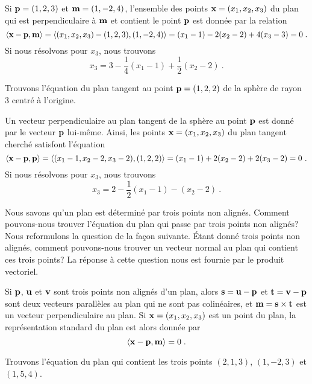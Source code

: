 {\begin{egg}
Si $\mathbf{p}=(1,2,3)$ et $\mathbf{m} = (1,-2,4)$, l'ensemble des points
$\mathbf{x}=(x_1,x_2,x_3)$ du plan qui est perpendiculaire à $\mathbf{m}$ et
contient le point $\mathbf{p}$ est donnée par la relation
\[
\left\langle{\mathbf{x}-\mathbf{p}} , {\mathbf{m}}\right\rangle =
\left\langle{(x_1,x_2,x_3) - (1,2,3)} , {(1,-2,4)}\right\rangle = (x_1-1) -2 (x_2-2) + 4(x_3-3) = 0 \; .
\]
Si nous résolvons pour $x_3$, nous trouvons
\[
x_3 = 3 - \frac{1}{4}(x_1-1)  + \frac{1}{2} (x_2-2) \ .
\]
\end{egg}

\begin{egg}
Trouvons l'équation du plan tangent au point $\mathbf{p}= (1,2,2)$ de la
sphère de rayon $3$ centré à l'origine.

Un vecteur perpendiculaire au plan tangent de la sphère au point
$\mathbf{p}$ est donné par le vecteur $\mathbf{p}$ lui-même.  Ainsi, les
points $\mathbf{x}=(x_1,x_2,x_3)$ du plan tangent cherché satisfont l'équation
\[
\ps{\VEC{x} - \VEC{p}}{\VEC{p}} = 
\ps{(x_1-1,x_2-2,x_3-2)}{(1,2,2)} = (x_1-1) + 2(x_2-2) + 2(x_3-2) = 0 \ .
\]
Si nous résolvons pour $x_3$, nous trouvons
\[
x_3 = 2 - \frac{1}{2}(x_1-1) - (x_2-2) \ .
\]
\label{TANG_PLANE}
\end{egg}

Nous savons qu'un plan est déterminé par trois points non alignés.
Comment pouvons-nous trouver l'équation du plan qui passe par trois points
non alignés?  Nous reformulons la question de la façon suivante. Étant
donné trois points non alignés, comment pouvons-nous trouver un vecteur
normal au plan qui contient ces trois points?  La réponse à cette
question nous est fournie par le produit vectoriel.

\begin{focus}{\prp}
Si $\mathbf{p}$, $\mathbf{u}$ et $\mathbf{v}$ sont trois points non alignés
d'un plan, alors $\mathbf{s} = \mathbf{u} - \mathbf{p}$ et
$\mathbf{t} = \mathbf{v} - \mathbf{p}$ sont deux vecteurs parallèles au plan
qui ne sont pas colinéaires, et $\mathbf{m} = \mathbf{s} \times \mathbf{t}$ est un
vecteur perpendiculaire au plan.  Si $\mathbf{x} = (x_1,x_2,x_3)$ est un
point du plan, la représentation standard du plan est alors donnée par
\[
\left\langle{\mathbf{x} - \mathbf{p}} , {\mathbf{m}}\right\rangle = 0 \; .
\]
\end{focus}

\begin{egg}
Trouvons l'équation du plan qui contient les trois points $(2,1,3)$,
$(1,-2,3)$ et $(1,5,4)$.


\end{egg}}
